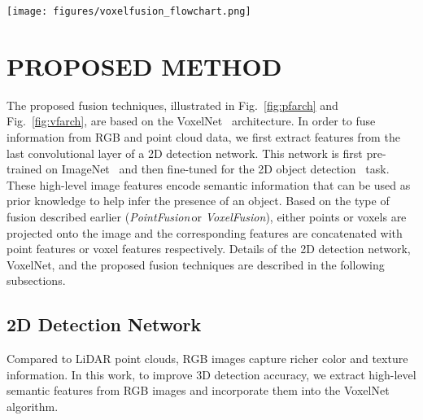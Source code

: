\documentclass[letterpaper, 10 pt, conference]{ieeeconf}
\newcommand{\PF}{\textit{PointFusion}}
\newcommand{\VF}{\textit{VoxelFusion}}
\begin{document}
\begin{figure*}[ht!]
	\centering
	\texttt{[image: figures/voxelfusion\_flowchart.png]}
	\vskip-10pt	
	\caption{Overview of the proposed MVX-Net \VF{\,}method. The method uses convolutional filters of pre-trained 2D faster RCNN to compute the image feature map. Note that the RPN and RCN (shown in shaded rectangle) are not part of the 3D inference pipeline. The non-empty voxels are projected to the image using the calibration information to obtain the ROIs. The features within each ROI are pooled and appended to the voxel features computed by VFE layers. The 3D RPN processes the aggregated data and produces the 3D detections.}
	\label{fig:vfarch}
	\vspace{-0.5cm}
\end{figure*}

\section{PROPOSED METHOD}
\label{sec:proposedmethod}
The proposed fusion techniques, illustrated in Fig.~\ref{fig:pfarch} and Fig.~\ref{fig:vfarch}, are based on the VoxelNet~\cite{REF:zhou2017voxelnet} architecture. In order to fuse information from RGB and point cloud data, we first extract features from the last convolutional layer of a 2D detection network. This network is first pre-trained on ImageNet~\cite{REF:ILSVRC15,simonyan2014very} and then fine-tuned for the 2D object detection~\cite{ren2015faster} task. These high-level image features encode semantic information that can be used as prior knowledge to help infer the presence of an object. Based on the type of fusion described earlier (\PF{\,}or \VF), either points or voxels are projected onto the image and the corresponding features are concatenated with point features or voxel features respectively. Details of the 2D detection network, VoxelNet, and the proposed fusion techniques are described in the following subsections.

\subsection{2D Detection Network}
\label{ssec:2ddetector}

Compared to LiDAR point clouds, RGB images capture richer color and texture information. In this work, to improve 3D detection accuracy, we extract high-level semantic features from RGB images and incorporate them into the VoxelNet algorithm.
\end{document}
